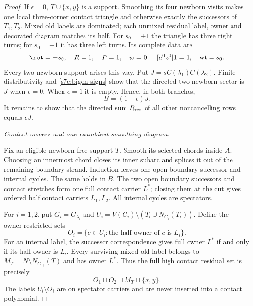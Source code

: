 \begin{proof}
If $\epsilon=0$, $T\cup\{x,y\}$ is a support.  Smoothing its four
newborn visits makes one local three-corner contact triangle and otherwise
exactly the successors of $T_1,T_2$.  Mixed old labels are dominated;
each unmixed residual label, owner and decorated diagram matches its half.
For $s_0=+1$ the triangle has three right turns; for $s_0=-1$ it has
three left turns.  Its complete data are
\begin{equation}\label{s7c:triangle-data}
 \rot=-s_0,\quad R=1,\quad P=1,\quad w=0,\quad
 [a^0z^0]1=1,\quad\operatorname{wt}=s_0.
\end{equation}
Every two-newborn support arises this way.  Put
$J=sC(\lambda_1)C(\lambda_2)$.  Finite distributivity and
\eqref{s7c:bigon-signs} show that the directed two-newborn sector is
$J$ when $\epsilon=0$.  When $\epsilon=1$ it is empty.  Hence, in
both branches,
\begin{equation}\label{s7c:sector-split}
 B=(1-\epsilon)J.
\end{equation}
It remains to show that the directed sum $R_{\rm ret}$ of all other
noncancelling rows equals $\epsilon J$.

\par\medskip\noindent\emph{Contact owners and one coambient smoothing diagram.}\par

Fix an eligible newborn-free support $T$.  Smooth its selected chords
inside $A$.  Choosing an innermost chord closes its inner subarc and
splices it out of the remaining boundary strand.  Induction leaves one
open boundary successor and internal cycles.  The same holds in $B$.
The two open boundary successors and contact stretches form one full
contact carrier $L^*$; closing them at the cut gives ordered half contact
carriers $L_1,L_2$.  All internal cycles are spectators.

For $i=1,2$, put $G_i=G_{\lambda_i}$ and
$U_i=V(G_i)\setminus(T_i\cup N_{G_i}(T_i))$.  Define the
owner-restricted sets
\begin{equation}\label{s7c:owner-restriction}
 O_i=\{c\in U_i:\text{the half owner of }c\text{ is }L_i\}.
\end{equation}
For an internal label, the successor correspondence gives full owner
$L^*$ if and only if its half owner is $L_i$.  Every surviving mixed
old label belongs to
$M_T=N\setminus N_{G_{P_2}}(T)$ and has owner $L^*$.
Thus the full high contact residual set is precisely
\begin{equation}\label{s7c:full-contact-set}
 O_1\sqcup O_2\sqcup M_T\sqcup\{x,y\}.
\end{equation}
The labels $U_i\setminus O_i$ are on spectator carriers and are never
inserted into a contact polynomial.


\end{proof}
